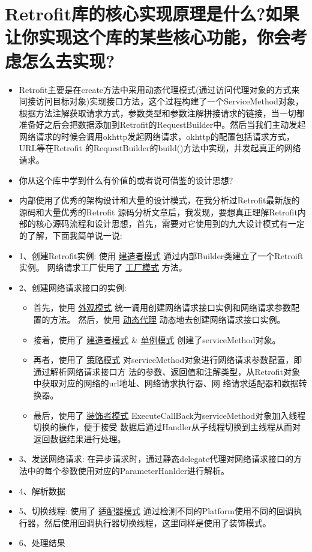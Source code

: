 \documentclass[9pt, b5paper]{article}
\begin{document}
\section{Retrofit库的核心实现原理是什么?如果让你实现这个库的某些核心功能，你会考虑怎么去实现?}
\label{sec-2}
\begin{itemize}
\item Retrofit主要是在create方法中采用动态代理模式(通过访问代理对象的方式来间接访问目标对象)实现接口方法，这个过程构建了一个ServiceMethod对象，根据方法注解获取请求方式，参数类型和参数注解拼接请求的链接，当一切都准备好之后会把数据添加到Retrofit的RequestBuilder中。然后当我们主动发起网络请求的时候会调用okhttp发起网络请求，okhttp的配置包括请求方式，URL等在Retrofit 的RequestBuilder的build()方法中实现，并发起真正的网络请求。
\item 你从这个库中学到什么有价值的或者说可借鉴的设计思想?
\item 内部使用了优秀的架构设计和大量的设计模式，在我分析过Retrofit最新版的源码和大量优秀的Retrofit 源码分析文章后，我发现，要想真正理解Retrofit内部的核心源码流程和设计思想，首先，需要对它使用到的九大设计模式有一定的了解，下面我简单说一说:
\item 1、创建Retrofit实例: 使用 \uline{建造者模式} 通过内部Builder类建立了一个Retroift实例。 网络请求工厂使用了 \uline{工厂模式} 方法。
\item 2、创建网络请求接口的实例:
\begin{itemize}
\item 首先，使用 \uline{外观模式} 统一调用创建网络请求接口实例和网络请求参数配置的方法。 然后，使用 \uline{动态代理} 动态地去创建网络请求接口实例。
\item 接着，使用了 \uline{建造者模式} \& \uline{单例模式} 创建了serviceMethod对象。
\item 再者，使用了 \uline{策略模式} 对serviceMethod对象进行网络请求参数配置，即通过解析网络请求接口方 法的参数、返回值和注解类型，从Retrofit对象中获取对应的网络的url地址、网络请求执行器、网 络请求适配器和数据转换器。
\item 最后，使用了 \uline{装饰者模式} ExecuteCallBack为serviceMethod对象加入线程切换的操作，便于接受 数据后通过Handler从子线程切换到主线程从而对返回数据结果进行处理。
\end{itemize}
\item 3、发送网络请求: 在异步请求时，通过静态delegate代理对网络请求接口的方法中的每个参数使用对应的ParameterHanlder进行解析。
\item 4、解析数据
\item 5、切换线程: 使用了 \uline{适配器模式} 通过检测不同的Platform使用不同的回调执行器，然后使用回调执行器切换线程，这里同样是使用了装饰模式。
\item 6、处理结果
\end{itemize}
\end{document}
